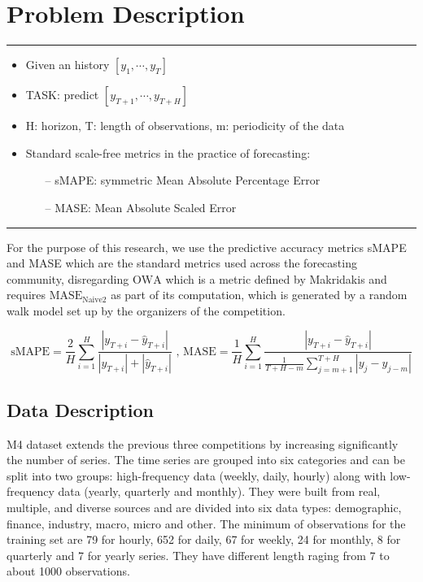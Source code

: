 \documentclass{article}
\begin{document}
\section{Problem Description}
\label{problemdescription}

\par\noindent\rule{\textwidth}{0.4pt}

\begin{itemize}
	\item Given an history $[ y_1, \cdots, y_T ]$
	\item TASK: predict $[y_{T+1}, \cdots , y_{T+H} ]$
	\item H: horizon, T: length of observations, m: periodicity of the data
	\item Standard scale-free metrics in the practice of forecasting:
	\begin{itemize}
			\item [--]  sMAPE: symmetric Mean Absolute Percentage Error
			\item [--]  MASE: Mean Absolute Scaled Error
	\end{itemize}
\end{itemize}

\par\noindent\rule{\textwidth}{0.4pt}

For the purpose of this research, we use the predictive accuracy metrics sMAPE and MASE which are the standard metrics used across the forecasting community, 
disregarding $\text{OWA}$ which is a metric defined by Makridakis and requires $\text{MASE}_{\text{Naive2}}$  as part of its computation, which is generated by a random walk model set up by the organizers of the competition.

\[
	\text{sMAPE} = \frac{2}{H}  \sum_{i=1}^{H} \frac{ | y_{T+i}  - \hat{y}_{T+i} | } { | y_{T+i} | + | \hat{y}_{T+i} | } \text{ ,     } 
	\text{MASE} = \frac{1}{H}  \sum_{i=1}^{H} \frac{ | y_{T+i}  - \hat{y}_{T+i} | } { \frac{1} {T + H - m} \sum_{j=m+1}^{T+H}  | y_j  - y_{j-m} | }
\]



\subsection{Data Description}
\label{datadescription}

M4 dataset extends the previous three competitions by increasing significantly the number of series. The time series are grouped into six categories and can be split into two groups: 
high-frequency data (weekly, daily, hourly) along with low-frequency data (yearly, quarterly and monthly).  They were built from real, multiple, and diverse sources and are divided into six data types:
demographic, finance, industry, macro, micro and other. The minimum of observations for the training set are 79 for hourly, 652 for daily, 67 for weekly, 24 for monthly, 8 for quarterly and 7 for yearly series.
They have different length raging from 7 to about 1000 observations.
\end{document}
